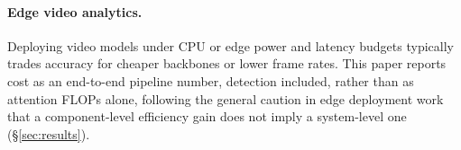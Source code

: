 \paragraph{Edge video analytics.}
Deploying video models under CPU or edge power and latency budgets typically
trades accuracy for cheaper backbones or lower frame rates. This paper
reports cost as an end-to-end pipeline number, detection included, rather
than as attention FLOPs alone, following the general caution in edge
deployment work that a component-level efficiency gain does not imply a
system-level one (\S\ref{sec:results}).
